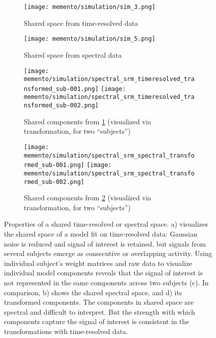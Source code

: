 \begin{figure}
	\centering
	\begin{subfigure}{.4\textwidth}
		\texttt{[image: memento/simulation/sim\_3.png]}
		\caption{Shared space from time-resolved data}
		\label{fig:sim-timeresolved-shared}
	\end{subfigure}
	\begin{subfigure}{.43\textwidth}
		\texttt{[image: memento/simulation/sim\_5.png]}
		\caption{Shared space from spectral data}
		\label{fig:sim-spectral-shared}
	\end{subfigure}
	\centering
	\begin{subfigure}{1.\textwidth}
		\centering
		\texttt{[image: memento/simulation/spectral\_srm\_timeresolved\_transformed\_sub-001.png]}
		\texttt{[image: memento/simulation/spectral\_srm\_timeresolved\_transformed\_sub-002.png]}
		\caption{Shared components from \ref{fig:sim-timeresolved-shared} (visualized via transformation, for two ``subjects'')}
		\label{fig:sim-resolved-transformed}
	\end{subfigure}
	\centering
	\begin{subfigure}{1.\textwidth}
		\centering
		\texttt{[image: memento/simulation/spectral\_srm\_spectral\_transformed\_sub-001.png]}
		\texttt{[image: memento/simulation/spectral\_srm\_spectral\_transformed\_sub-002.png]}
		\caption{Shared components from \ref{fig:sim-spectral-shared} (visualized via transformation, for two ``subjects'')}
		\label{fig:sim-shared-transformed}
	\end{subfigure}

	\caption[Properties of a shared time-resolved or spectral space]{Properties of a shared time-resolved or spectral space. a) visualizes the shared space of a model fit on time-resolved data: Gaussian noise is reduced and signal of interest is retained, but signals from several subjects emerge as consecutive or overlapping activity. Using individual subject's weight matrices and raw data to visualize individual model components reveals that the signal of interest is not represented in the same components across two subjects (c). In comparison, b) shows the shared spectral space, and d) its transformed components. The components in shared space are spectral and difficult to interpret. But the strength with which components capture the signal of interest is consistent in the transformations with time-resolved data.}
	\label{fig:sim-spectral}
\end{figure}



